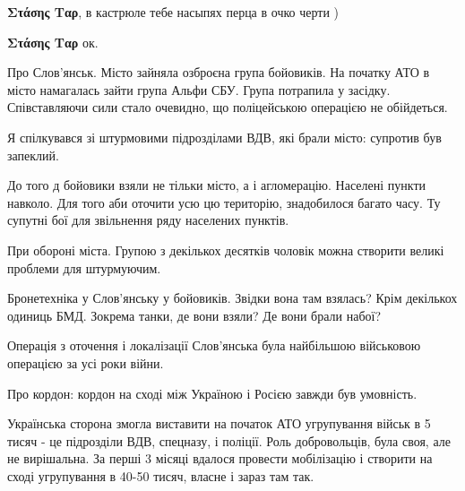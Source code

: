 \begin{itemize}
\begin{itemize}
 
\textbf{Στάσης Ταρ}, в кастрюле тебе насыпях перца в очко черти )

 
\textbf{Στάσης Ταρ} ок.

Про Слов’янськ. Місто зайняла озброєна група бойовиків. На початку АТО в місто
намагалась зайти група Альфи СБУ. Група потрапила у засідку. Співставляючи сили
стало очевидно, що поліцейською операцією не обійдеться.

Я спілкувався зі штурмовими підрозділами ВДВ, які брали місто: супротив був
запеклий.

До того д бойовики взяли не тільки місто, а і агломерацію. Населені пункти
навколо. Для того аби оточити усю цю територію, знадобилося багато часу. Ту
супутні бої для звільнення ряду населених пунктів.

При обороні міста. Групою з декількох десятків чоловік можна створити великі
проблеми для штурмуючим.

Бронетехніка у Слов’янську у бойовиків. Звідки вона там взялась? Крім декількох
одиниць БМД. Зокрема танки, де вони взяли? Де вони брали набої?

Операція з оточення і локалізації Слов’янська була найбільшою військовою
операцією за усі роки війни.

Про кордон: кордон на сході між Україною і Росією завжди був умовність.

Українська сторона змогла виставити на початок АТО угрупування військ в 5 тисяч
- це підрозділи ВДВ, спецназу, і поліції. Роль добровольців, була своя, але не
вирішальна. За перші 3 місяці вдалося провести мобілізацію і створити на сході
угрупування в 40-50 тисяч, власне і зараз там так.

 


\end{itemize}
\end{itemize}
